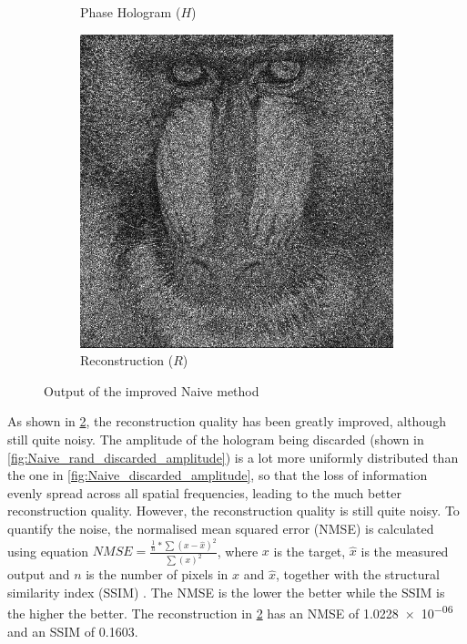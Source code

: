 \begin{figure}[H]
\begin{subfigure}[t]{0.3\textwidth}
    \caption{Phase Hologram ($H$)}
    \label{fig:Naive_rand_holo}
  \end{subfigure}
  \hfill
  \begin{subfigure}[t]{0.3\textwidth}
    \centering
    \includegraphics[width=\textwidth]{Naive_rand_recon.png}
    \caption{Reconstruction ($R$)}
    \label{fig:Naive_rand_recon}
  \end{subfigure}
  \caption{Output of the improved Naive method}
  \label{fig:Output of the improved Naive method}
\end{figure}

As shown in \cref{fig:Naive_rand_recon}, the reconstruction quality has been greatly improved, although still quite noisy. The amplitude of the hologram being discarded (shown in \cref{fig:Naive_rand_discarded_amplitude}) is a lot more uniformly distributed than the one in \cref{fig:Naive_discarded_amplitude}, so that the loss of information evenly spread across all spatial frequencies, leading to the much better reconstruction quality. However, the reconstruction quality is still quite noisy. To quantify the noise, the normalised mean squared error (NMSE) is calculated using equation $NMSE = \frac{\frac{1}{n} * \sum (x - \hat{x})^2}{\sum (x)^2}$, where $x$ is the target, $\hat{x}$ is the measured output and $n$ is the number of pixels in $x$ and $\hat{x}$, together with the structural similarity index (SSIM) \cite{Wang2004_SSIM}. The NMSE is the lower the better while the SSIM is the higher the better. The reconstruction in \cref{fig:Naive_rand_recon} has an NMSE of \num{1.0228e-06} and an SSIM of 0.1603.

